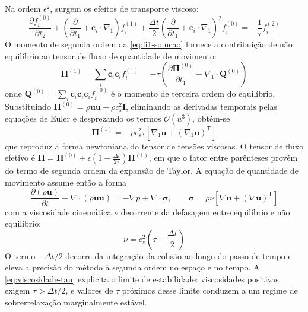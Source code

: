 Na ordem $\epsilon^2$, surgem os efeitos de transporte viscoso:
\begin{equation}
    \frac{\partial f_i^{(0)}}{\partial t_2} + \left( \frac{\partial}{\partial t_1} + \mathbf{c}_i \cdot \nabla_1 \right) f_i^{(1)} + \frac{\Delta t}{2} \left( \frac{\partial}{\partial t_1} + \mathbf{c}_i \cdot \nabla_1 \right)^2 f_i^{(0)} = -\frac{1}{\tau} f_i^{(2)}
\end{equation}
O momento de segunda ordem da \eqref{eq:fi1-solucao} fornece a contribuição de não equilíbrio ao tensor de fluxo de quantidade de movimento:
\begin{equation}\label{eq:pi1}
    \boldsymbol{\Pi}^{(1)} = \sum_i \mathbf{c}_i \mathbf{c}_i f_i^{(1)} = -\tau \left( \frac{\partial \boldsymbol{\Pi}^{(0)}}{\partial t_1} + \nabla_1 \cdot \mathbf{Q}^{(0)} \right)
\end{equation}
onde $\mathbf{Q}^{(0)} = \sum_i \mathbf{c}_i \mathbf{c}_i \mathbf{c}_i f_i^{(0)}$ é o momento de terceira ordem do equilíbrio.
Substituindo $\boldsymbol{\Pi}^{(0)} = \rho \mathbf{u}\mathbf{u} + \rho c_s^2 \mathbf{I}$, eliminando as derivadas temporais pelas equações de Euler e desprezando os termos $\mathcal{O}(u^3)$, obtém-se
\begin{equation}\label{eq:pi1-final}
    \boldsymbol{\Pi}^{(1)} = -\rho c_s^2 \tau \left[ \nabla_1 \mathbf{u} + (\nabla_1 \mathbf{u})^{\mathsf{T}} \right]
\end{equation}
que reproduz a forma newtoniana do tensor de tensões viscosas.
O tensor de fluxo efetivo é $\boldsymbol{\Pi} = \boldsymbol{\Pi}^{(0)} + \epsilon \left( 1 - \frac{\Delta t}{2\tau} \right) \boldsymbol{\Pi}^{(1)}$, em que o fator entre parênteses provém do termo de segunda ordem da expansão de Taylor.
A equação de quantidade de movimento assume então a forma
\begin{equation}
    \frac{\partial (\rho \mathbf{u})}{\partial t} + \nabla \cdot (\rho \mathbf{u}\mathbf{u}) = -\nabla p + \nabla \cdot \boldsymbol{\sigma}, \qquad \boldsymbol{\sigma} = \rho \nu \left[ \nabla \mathbf{u} + (\nabla \mathbf{u})^{\mathsf{T}} \right]
\end{equation}
com a viscosidade cinemática $\nu$ decorrente da defasagem entre equilíbrio e não equilíbrio:
\begin{equation}\label{eq:viscosidade-tau}
    \nu = c_s^2 \left( \tau - \frac{\Delta t}{2} \right)
\end{equation}
O termo $-\Delta t/2$ decorre da integração da colisão ao longo do passo de tempo e eleva a precisão do método à segunda ordem no espaço e no tempo.
A \eqref{eq:viscosidade-tau} explicita o limite de estabilidade: viscosidades positivas exigem $\tau > \Delta t / 2$, e valores de $\tau$ próximos desse limite conduzem a um regime de sobrerrelaxação marginalmente estável.


